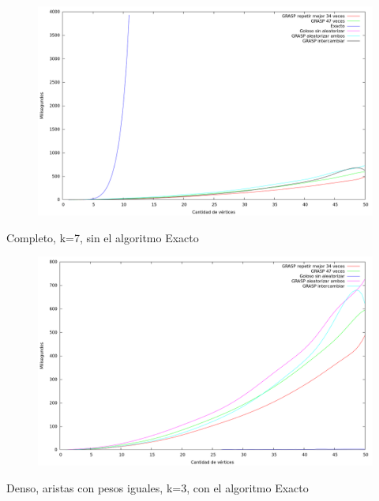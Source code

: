 \begin{figure}[H]
  \begin{center}
    \includegraphics[scale=0.35]{imagenes/ej6-completo-k7-tiempo-exacto.png}
  \end{center}
\end{figure}

Completo, k=7, sin el algoritmo Exacto

\begin{figure}[H]
  \begin{center}
    \includegraphics[scale=0.35]{imagenes/ej6-completo-k7-tiempo.png}
  \end{center}
\end{figure}

Denso, aristas con pesos iguales, k=3, con el algoritmo Exacto

